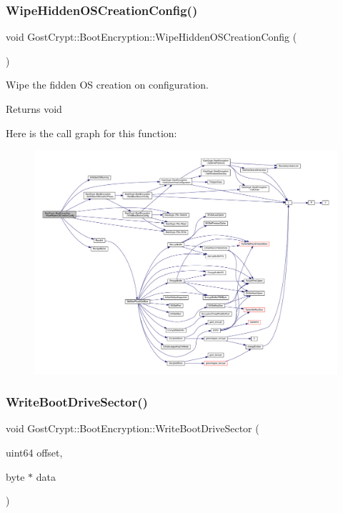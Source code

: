 \subsubsection{\texorpdfstring{Wipe\+Hidden\+O\+S\+Creation\+Config()}{WipeHiddenOSCreationConfig()}}
{\footnotesize\ttfamily void Gost\+Crypt\+::\+Boot\+Encryption\+::\+Wipe\+Hidden\+O\+S\+Creation\+Config (\begin{DoxyParamCaption}{ }\end{DoxyParamCaption})}



Wipe the fidden OS creation on configuration. 

\begin{DoxyReturn}{Returns}
void 
\end{DoxyReturn}
Here is the call graph for this function\+:
\nopagebreak
\begin{figure}[H]
\begin{center}
\leavevmode
\includegraphics[width=350pt]{class_gost_crypt_1_1_boot_encryption_ab87016e42d7f7826282297e50db00742_cgraph}
\end{center}
\end{figure}
\mbox{\label{class_gost_crypt_1_1_boot_encryption_ac55ac2e6869a99099651444e9e1702b9}} 
\subsubsection{\texorpdfstring{Write\+Boot\+Drive\+Sector()}{WriteBootDriveSector()}}
{\footnotesize\ttfamily void Gost\+Crypt\+::\+Boot\+Encryption\+::\+Write\+Boot\+Drive\+Sector (\begin{DoxyParamCaption}\item[{uint64}]{offset,  }\item[{byte $\ast$}]{data }\end{DoxyParamCaption})}



